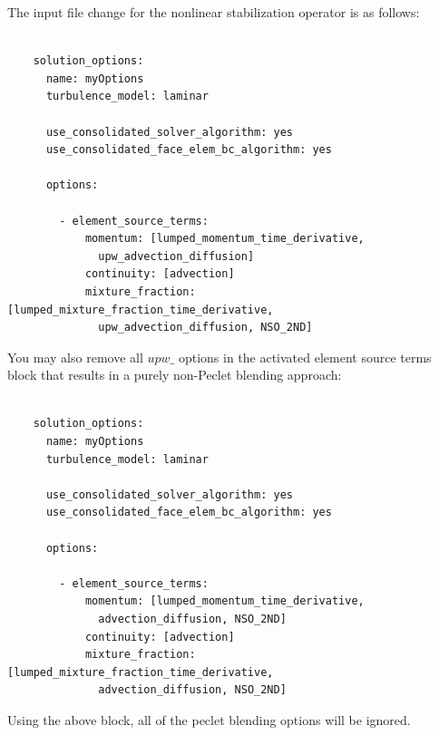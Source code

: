 \documentclass{article}
\begin{document}
The input file change for the nonlinear stabilization operator is as follows:

          \begin{lstlisting}

    solution_options:
      name: myOptions
      turbulence_model: laminar 

      use_consolidated_solver_algorithm: yes
      use_consolidated_face_elem_bc_algorithm: yes

      options:

        - element_source_terms:
            momentum: [lumped_momentum_time_derivative, 
              upw_advection_diffusion]
            continuity: [advection]
            mixture_fraction: [lumped_mixture_fraction_time_derivative, 
              upw_advection_diffusion, NSO_2ND]

          \end{lstlisting}

You may also remove all $upw\_$ options in the activated element source terms block that 
results in a purely non-Peclet blending approach:

          \begin{lstlisting}

    solution_options:
      name: myOptions
      turbulence_model: laminar 

      use_consolidated_solver_algorithm: yes
      use_consolidated_face_elem_bc_algorithm: yes

      options:

        - element_source_terms:
            momentum: [lumped_momentum_time_derivative, 
              advection_diffusion, NSO_2ND]
            continuity: [advection]
            mixture_fraction: [lumped_mixture_fraction_time_derivative, 
              advection_diffusion, NSO_2ND]

          \end{lstlisting}

Using the above block, all of the peclet blending options will be ignored.
\end{document}
